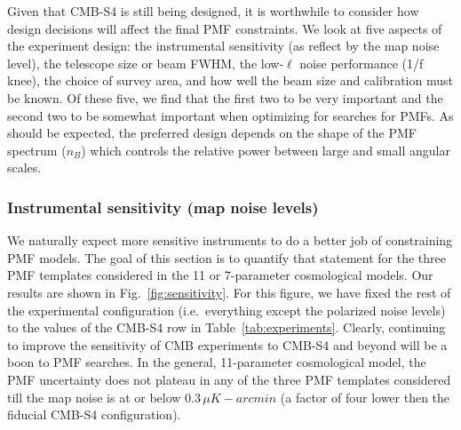 \documentclass[apj]{emulateapj}
\newcommand{\ukarcmin}{\ensuremath{\mu}K-arcmin}
\begin{document}
Given that CMB-S4 is still being designed, it is worthwhile to consider how design decisions will affect the final PMF constraints. 
We look at five aspects of the experiment design: the instrumental sensitivity (as reflect by the map noise level), the telescope size or beam FWHM,  the low-$\ell$ noise performance (1/f knee), the choice of survey area,  and how well the beam size and calibration must be known. 
Of these five, we find that the first two to be very important and the second two to be somewhat important when optimizing for searches for PMFs. 
As should be expected, the preferred design depends on the shape of the PMF spectrum ($n_B$) which controls  the relative power between large and small angular scales. 

\subsubsection{Instrumental sensitivity (map noise levels)}

We naturally expect more sensitive instruments to do a better job of constraining PMF models. 
The goal of this section is to quantify that statement for the three PMF templates considered in the 11 or 7-parameter cosmological models. 
Our results are shown in Fig.~\ref{fig:sensitivity}. 
For this figure, we have fixed the rest of the experimental configuration (i.e.~everything except the polarized noise levels) to the values of the CMB-S4 row in Table~\ref{tab:experiments}. 
Clearly, continuing to improve the sensitivity of CMB experiments to CMB-S4 and beyond will be a boon to PMF searches. 
In the general, 11-parameter cosmological model, the PMF uncertainty does not plateau in any of the three PMF templates considered till the map noise is at or below $0.3\,\ukarcmin$ (a factor of four lower then the fiducial CMB-S4 configuration). 
\end{document}
